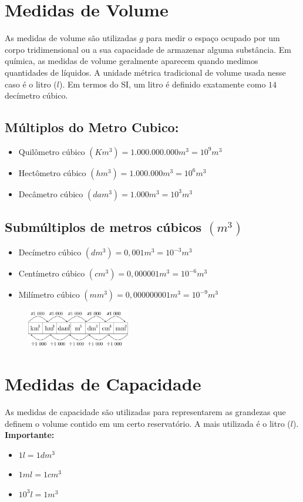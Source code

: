 \section{Medidas de Volume} 
As medidas de volume são utilizadas $g$ para medir o espaço ocupado por um corpo tridimensional ou a sua capacidade de armazenar alguma
substância. Em química, as medidas de volume geralmente aparecem quando medimos quantidades de líquidos. A unidade métrica tradicional de volume usada nesse caso é o litro ($l$). Em termos
do SI, um litro é definido exatamente como $14$ decímetro cúbico.

\subsection{Múltiplos do Metro Cubico:}
		\begin{itemize}
		    \item Quilômetro cúbico $(Km^3) = 1.000.000.000 m^3 = 10^9 m^3$
		    \item Hectômetro cúbico $(hm^3) = 1.000.000 m^3 = 10^6 m^3$
		    \item Decâmetro cúbico $(dam^3) = 1.000 m^3 = 10^3 m^3$
		\end{itemize}
	
\subsection{Submúltiplos de metros cúbicos $(m^3)$}
		\begin{itemize}
		    \item Decímetro cúbico $(dm^3) = 0,001 m^3 = 10^{-3} m^3$
		    \item Centímetro cúbico $(cm^3) = 0,000001 m^3 = 10^{-6} m^3$
		    \item Milímetro cúbico $(mm^3) = 0,000000001 m^3 = 10^{-9} m^3$
		\end{itemize}
		
		\begin{figure}[!h]
		    \centering 
            \includegraphics[width=0.4\textwidth]{imagens/matematicaBasica/sistemaDeUnidades/MultiplosDeMetroCubico.pdf}
		\end{figure}
     
\section{Medidas de Capacidade}
As medidas de capacidade são utilizadas para representarem
as grandezas que definem o volume contido em um certo
reservatório. A mais utilizada é o litro ($l$).
	\\\textbf{Importante:}
	\begin{itemize}
	    \item $1l = 1dm^3$
	    \item $1 ml = 1 cm^3$
	    \item $10^3 l = 1 m^3$
	\end{itemize}
	
